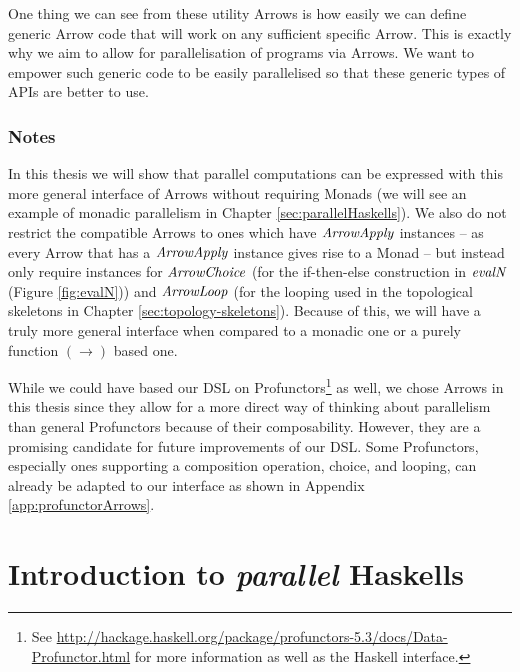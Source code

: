 \documentclass[paper=A4,twoside=true,openright,parskip=full,chapterprefix=true,headings=normal,bibliography=totoc,listof=totoc,titlepage=on,captions=tableabove,draft=false,british]{scrreprt}%
\begin{document}
One thing we can see from these utility Arrows is how easily we can
define generic Arrow code that will work on any sufficient specific
Arrow. This is exactly why we aim to allow for parallelisation of
programs via Arrows. We want to empower such generic code to be easily
parallelised so that these generic types of APIs are better to use.

\hypertarget{notes}{%
\subsubsection{Notes}\label{notes}}

In this thesis we will show that parallel computations can be expressed
with this more general interface of Arrows without requiring Monads (we
will see an example of monadic parallelism in Chapter
\ref{sec:parallelHaskells}). We also do not restrict the compatible
Arrows to ones which have \ensuremath{\Conid{ArrowApply}} instances -- as every Arrow that
has a \ensuremath{\Conid{ArrowApply}} instance gives rise to a Monad -- but instead only
require instances for \ensuremath{\Conid{ArrowChoice}} (for the if-then-else construction
in \ensuremath{\Varid{evalN}} (Figure \ref{fig:evalN})) and \ensuremath{\Conid{ArrowLoop}} (for the looping
used in the topological skeletons in Chapter
\ref{sec:topology-skeletons}). Because of this, we will have a truly
more general interface when compared to a monadic one or a purely
function \ensuremath{(\to )} based one.

While we could have based our DSL on Profunctors\footnote{See
  \url{http://hackage.haskell.org/package/profunctors-5.3/docs/Data-Profunctor.html}
  for more information as well as the Haskell interface.} as well, we
chose Arrows in this thesis since they allow for a more direct way of
thinking about parallelism than general Profunctors because of their
composability. However, they are a promising candidate for future
improvements of our DSL. Some Profunctors, especially ones supporting a
composition operation, choice, and looping, can already be adapted to
our interface as shown in Appendix \ref{app:profunctorArrows}.

\hypertarget{introduction-to-parallel-haskells}{%
\section{\texorpdfstring{Introduction to \emph{parallel}
Haskells}{Introduction to parallel Haskells}}\label{introduction-to-parallel-haskells}}
\end{document}
